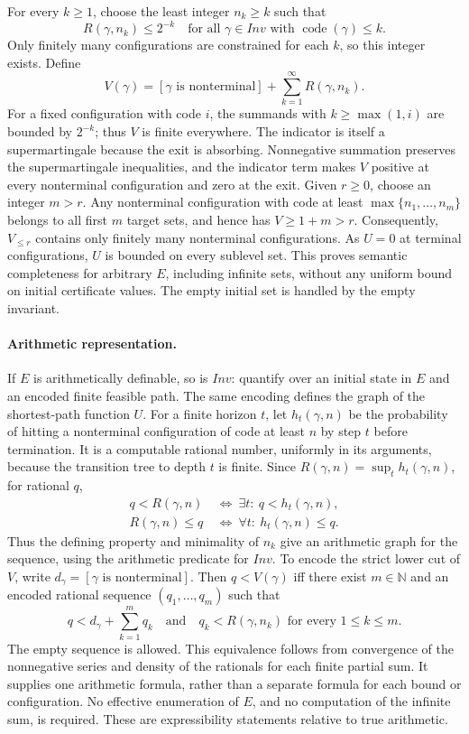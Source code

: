 For every $k\geq1$, choose the least integer $n_k\geq k$ such that
\[
 R(\gamma,n_k)\leq2^{-k}
 \quad\text{for all }\gamma\in\mathit{Inv}
                     \text{ with }\operatorname{code}(\gamma)\leq k.
\]
Only finitely many configurations are constrained for each $k$, so this
integer exists. Define
\[
 V(\gamma)=[\gamma\text{ is nonterminal}]
              +\sum_{k=1}^{\infty}R(\gamma,n_k).
\]
For a fixed configuration with code $i$, the summands with $k\geq\max(1,i)$
are bounded by $2^{-k}$; thus $V$ is finite everywhere. The indicator
is itself a supermartingale because the exit is absorbing. Nonnegative
summation preserves the supermartingale inequalities, and the indicator
term makes $V$ positive at every nonterminal configuration and zero at
the exit. Given $r\geq0$, choose an integer $m>r$. Any nonterminal
configuration with code at least $\max\{n_1,\ldots,n_m\}$ belongs to all
first $m$ target sets, and hence has $V\geq1+m>r$. Consequently,
$V_{\leq r}$ contains only finitely many nonterminal configurations.
As $U=0$ at terminal configurations, $U$ is bounded on every sublevel
set. This proves semantic completeness for arbitrary $E$, including
infinite sets, without any uniform bound on initial certificate values.
The empty initial set is handled by the empty invariant.

\paragraph{Arithmetic representation.}
If $E$ is arithmetically definable, so is $\mathit{Inv}$: quantify over
an initial state in $E$ and an encoded finite feasible path. The same
encoding defines the graph of the shortest-path function $U$. For a finite horizon $t$, let $h_t(\gamma,n)$ be the probability of
hitting a nonterminal configuration of code at least $n$ by step $t$
before termination. It is a computable rational number, uniformly in
its arguments, because the transition tree to depth $t$ is finite.
Since $R(\gamma,n)=\sup_t h_t(\gamma,n)$, for rational $q$,
\begin{align*}
 q<R(\gamma,n)&\ \Longleftrightarrow\ \exists t:\ q<h_t(\gamma,n),\\
 R(\gamma,n)\leq q&\ \Longleftrightarrow\ \forall t:\ h_t(\gamma,n)\leq q.
\end{align*}
Thus the defining property and minimality of $n_k$ give an arithmetic
graph for the sequence, using the arithmetic predicate for
$\mathit{Inv}$. To encode the strict lower cut of $V$, write
$d_\gamma=[\gamma\text{ is nonterminal}]$. Then $q<V(\gamma)$ iff
there exist $m\in\mathbb N$ and an encoded rational sequence
$(q_1,\ldots,q_m)$ such that
\[
 q<d_\gamma+\sum_{k=1}^m q_k
 \quad\text{and}\quad
 q_k<R(\gamma,n_k)\text{ for every }1\leq k\leq m.
\]
The empty sequence is allowed. This equivalence follows from convergence
of the nonnegative series and density of the rationals for each finite
partial sum. It supplies one arithmetic formula, rather than a separate
formula for each bound or configuration. No effective enumeration of
$E$, and no computation of the infinite sum, is required. These are
expressibility statements relative to true arithmetic.

